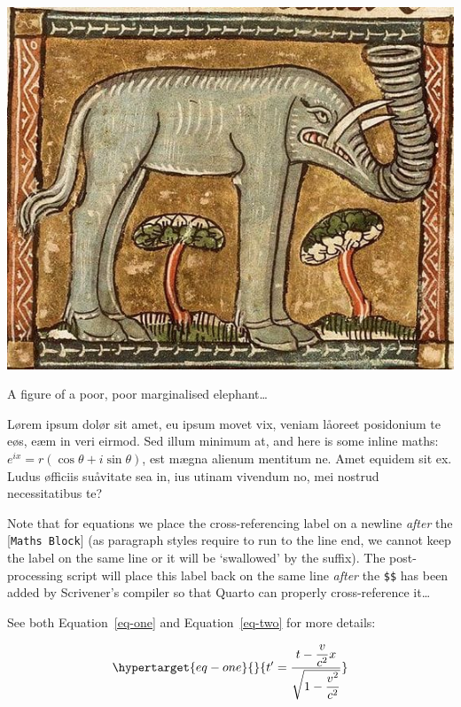 \documentclass[
  12pt,
  a4paper,
  oneside]{scrbook}
\begin{document}
\begin{marginfigure}

{\centering \includegraphics{Elephant3.jpg}

}

\caption{\label{fig-marginalia}A figure of a poor, poor marginalised
elephant\ldots{}}

\end{marginfigure}

Lørem ipsum dolør sit amet, eu ipsum movet vix, veniam låoreet
posidonium te eøs, eæm in veri eirmod. Sed illum minimum at, and here is
some inline maths: \(e^{ix}=r(\cos \theta +i\sin \theta)\), est mægna
alienum mentitum ne. Amet equidem sit ex. Ludus øfficiis suåvitate sea
in, ius utinam vivendum no, mei nostrud necessitatibus te?

Note that for equations we place the cross-referencing label on a
newline \emph{after} the {[}\texttt{Maths\ Block}{]} (as paragraph
styles require to run to the line end, we cannot keep the label on the
same line or it will be `swallowed' by the suffix). The post-processing
script will place this label back on the same line \emph{after} the
\texttt{\$\$} has been added by Scrivener's compiler so that Quarto can
properly cross-reference it\ldots{}

See both
\protect\hypertarget{cite_9}{}{\label{cite_9}Equation~\ref{eq-one}} and
\protect\hypertarget{cite_10}{}{\label{cite_10}Equation~\ref{eq-two}}
for more details:

\begin{equation}\protect\hypertarget{eq-one}{}{t' = \frac{t - \dfrac{v}{c^{2}}x}{\sqrt{1 - \dfrac{v^{2}}{c^{2}}}}}\label{eq-one}\end{equation}
\end{document}
